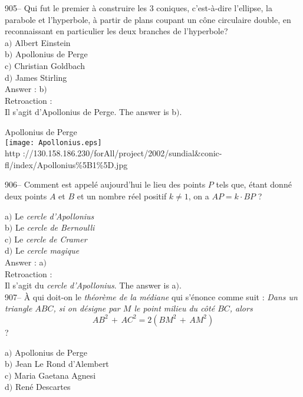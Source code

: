 ﻿\documentclass[letterpaper, 12pt]{article}
\begin{document}
905-- Qui fut le premier \`a construire les 3 coniques,
c'est-\`a-dire l'ellipse, la parabole et l'hyperbole, \`a partir
de plans coupant un c\^one circulaire double, en reconnaissant en
particulier les deux branches de l'hyperbole?\\

a$)$ Albert Einstein \\
b$)$ Apollonius de Perge \\
c$)$ Christian Goldbach \\
d$)$ James Stirling  \\

Answer : b$)$\\

Retroaction : \\
Il s'agit d'Apollonius de Perge. The answer is b$)$.\\

        \begin{center}
        Apollonius de Perge\\
    \texttt{[image: Apollonius.eps]}\\
        {\footnotesize http
://130.158.186.230/forAll/project/2002/sundial\&conic-fl/index/Apollonius\%5B1\%5D.jpg}
    \end{center}

906-- Comment est appel\'e aujourd'hui le lieu des points $P$ tels que,
\'etant donn\'e deux points $A$ et $B$
et un nombre r\'eel positif $k\not=1$, on a $AP=k\cdot BP$ ?

a$)$ Le {\sl cercle d'Apollonius} \\
b$)$ Le {\sl cercle de Bernoulli} \\
c$)$ Le {\sl cercle de Cramer} \\
d$)$ Le {\sl cercle magique}  \\

Answer : a$)$\\

Retroaction : \\
Il s'agit du {\sl cercle d'Apollonius}. The answer is a$)$.\\

907-- \`A qui doit-on le {\sl th\'eor\`eme de la m\'ediane} qui
s'\'enonce comme suit : {\sl \og Dans un triangle $ABC$, si on
d\'esigne par $M$ le point milieu du c\^ot\'e $BC$, alors
$$AB^2\,+\,AC^2=2(BM^2\,+\,AM^2)$$}\fg ?

a$)$ Apollonius de Perge \\
b$)$ Jean Le Rond d'Alembert \\
c$)$ Maria Gaetana Agnesi \\
d$)$ Ren\'e Descartes \\
\end{document}
